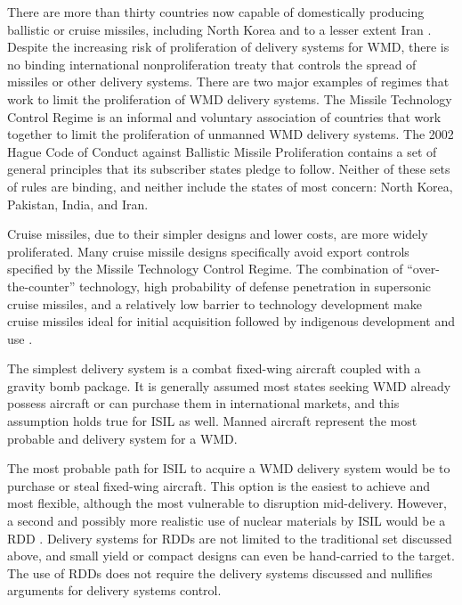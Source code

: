 \documentclass{report}
\begin{document}
There are more than thirty countries now capable of domestically producing ballistic or cruise missiles, including North Korea and to a lesser extent Iran \cite{U.S.CongressOfficeofTechnology1993}. Despite the increasing risk of proliferation of delivery systems for WMD, there is no binding international nonproliferation treaty that controls the spread of missiles or other delivery systems. There are two major examples of regimes that work to limit the proliferation of WMD delivery systems. The Missile Technology Control Regime is an informal and voluntary association of countries that work together to limit the proliferation of unmanned WMD delivery systems. The 2002 Hague Code of Conduct against Ballistic Missile Proliferation contains a set of general principles that its subscriber states pledge to follow. Neither of these sets of rules are binding, and neither include the states of most concern: North Korea, Pakistan, India, and Iran.

Cruise missiles, due to their simpler designs and lower costs, are more widely proliferated. Many cruise missile designs specifically avoid export controls specified by the Missile Technology Control Regime. The combination of \enquote{over-the-counter} technology, high probability of defense penetration in supersonic cruise missiles, and a relatively low barrier to technology development make cruise missiles ideal for initial acquisition followed by indigenous development and use \cite{OfficeoftheUnderSecretaryofDefenseforAcquisitionandTechnology1998}. 

The simplest delivery system is a combat fixed-wing aircraft coupled with a gravity bomb package. It is generally assumed most states seeking WMD already possess aircraft or can purchase them in international markets, and this assumption holds true for ISIL as well. Manned aircraft represent the most probable and delivery system for a WMD. 

The most probable path for ISIL to acquire a WMD delivery system would be to purchase or steal fixed-wing aircraft. This option is the easiest to achieve and most flexible, although the most vulnerable to disruption mid-delivery. However, a second and possibly more realistic use of nuclear materials by ISIL would be a RDD \cite{D.Esfandiary2014}. Delivery systems for RDDs are not limited to the traditional set discussed above, and small yield or compact designs can even be hand-carried to the target. The use of RDDs does not require the delivery systems discussed and nullifies arguments for delivery systems control. 
\end{document}
